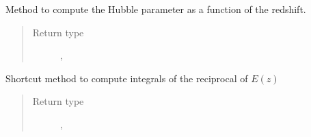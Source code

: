 \documentclass[letterpaper,10pt,english]{sphinxmanual}
\begin{document}
\begin{fulllineitems}
\begin{fulllineitems}
\begin{quote}
\begin{description}
\end{description}\end{quote}

\end{fulllineitems}


\begin{fulllineitems}
\label{\detokenize{api/seyfert.cosmology.cosmology.Cosmology:seyfert.cosmology.cosmology.Cosmology.computeHubbleParameter}}
\sphinxAtStartPar
Method to compute the Hubble parameter as a function of the redshift.
\begin{quote}\begin{description}
\item[{Return type}] \leavevmode
\sphinxAtStartPar
\sphinxcode{\sphinxupquote{Union}}{[}, \sphinxcode{\sphinxupquote{ndarray}}{]}

\end{description}\end{quote}

\end{fulllineitems}


\begin{fulllineitems}
\label{\detokenize{api/seyfert.cosmology.cosmology.Cosmology:seyfert.cosmology.cosmology.Cosmology.computeReciprocalDimensionlessHubbleParameter}}
\sphinxAtStartPar
Shortcut method to compute integrals of the reciprocal of \(E(z)\)
\begin{quote}\begin{description}
\item[{Return type}] \leavevmode
\sphinxAtStartPar
\sphinxcode{\sphinxupquote{Union}}{[}, \sphinxcode{\sphinxupquote{ndarray}}{]}

\end{description}\end{quote}


\end{fulllineitems}
\end{fulllineitems}
\end{document}
